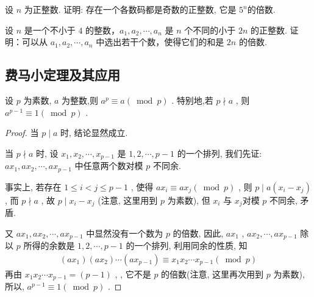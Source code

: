 \documentclass[aspectratio=169]{ctexbeamer}
\theoremstyle{definition}
\begin{document}
\begin{frame}[t]
	\begin{example}
		设 $n$ 为正整数. 证明: 存在一个各数码都是奇数的正整数, 它是 $5^{n}$的倍数.
	\end{example}
\end{frame}

\begin{frame}[t]
	\begin{example}
		设 $n$ 是一个不小于 $4$ 的整数，$a_1, a_2, \cdots, a_n$ 是 $n$ 个不同的小于 $2n$ 的正整数. 证明：可以从 $a_1, a_2, \cdots, a_n$ 中选出若干个数，使得它们的和是 $2n$ 的倍数.
	\end{example}
\end{frame}

\subsection{费马小定理及其应用}\setcounter{theorem}{0}
\begin{frame}
	\begin{theorem}
		设 $p$ 为素数, $a$ 为整数,则 $a^{p} \equiv a(\bmod p)$ . 特别地,若 $p \nmid a$ , 则 $a^{p-1} \equiv 1(\bmod p)$ .
	\end{theorem}
	\pause
	\begin{proof}
		当 $p \mid a$ 时, 结论显然成立.

		当 $p \nmid a$ 时, 设 $x_{1}, x_{2}, \cdots, x_{p-1}$ 是 $1,2, \cdots, p-1$ 的一个排列, 我们先证:  $a x_{1}, a x_{2}, \cdots, a x_{p-1}$ 中任意两个数对模 $p$ 不同余.

		事实上, 若存在 $1 \leqslant i<j \leqslant p-1$ , 使得 $a x_{i} \equiv a x_{j}(\bmod p)$ , 则 $p \mid a\left(x_{i}-x_{j}\right)$ , 而 $p \nmid a$ , 故 $p \mid x_{i}-x_{j}$ (注意, 这里用到 $p$ 为素数), 但 $x_{i}$ 与 $x_{j}$对模 $p$ 不同余, 矛盾.

		又 $a x_{1}, a x_{2}, \cdots, a x_{p-1}$ 中显然没有一个数为 $p$ 的倍数, 因此,  $a x_{1}$ ,  $a x_{2}, \cdots, a x_{p-1}$ 除以 $p$ 所得的余数是 $1,2, \cdots, p-1$ 的一个排列, 利用同余的性质, 知
		\begin{align*}
			\left(a x_{1}\right)\left(a x_{2}\right) \cdots\left(a x_{p-1}\right) \equiv x_{1} x_{2} \cdots x_{p-1}(\bmod p)
		\end{align*}
		再由 $x_{1} x_{2} \cdots x_{p-1}=(p-1)$ , , 它不是 $p$ 的倍数(注意, 这里再次用到 $p$ 为素数), 所以,  $a^{p-1} \equiv 1(\bmod p)$ .
	\end{proof}
\end{frame}
\end{document}
